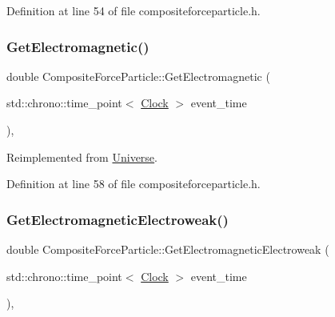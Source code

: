 Definition at line 54 of file compositeforceparticle.\+h.

\mbox{\label{class_composite_force_particle_a8ef336fed7e33d52a3baae4bd4dd32fd}} 
\subsubsection{\texorpdfstring{Get\+Electromagnetic()}{GetElectromagnetic()}}
{\footnotesize\ttfamily double Composite\+Force\+Particle\+::\+Get\+Electromagnetic (\begin{DoxyParamCaption}\item[{std\+::chrono\+::time\+\_\+point$<$ \mbox{\hyperlink{universe_8h_a0ef8d951d1ca5ab3cfaf7ab4c7a6fd80}{Clock}} $>$}]{event\+\_\+time }\end{DoxyParamCaption})\hspace{0.3cm}{\ttfamily [inline]}, {\ttfamily [virtual]}}



Reimplemented from \mbox{\hyperlink{class_universe_a63b850ef3f3394313353109d222bf5d1}{Universe}}.



Definition at line 58 of file compositeforceparticle.\+h.

\mbox{\label{class_composite_force_particle_ac26d7aab0daefcf13c68aba9e0f2ed53}} 
\subsubsection{\texorpdfstring{Get\+Electromagnetic\+Electroweak()}{GetElectromagneticElectroweak()}}
{\footnotesize\ttfamily double Composite\+Force\+Particle\+::\+Get\+Electromagnetic\+Electroweak (\begin{DoxyParamCaption}\item[{std\+::chrono\+::time\+\_\+point$<$ \mbox{\hyperlink{universe_8h_a0ef8d951d1ca5ab3cfaf7ab4c7a6fd80}{Clock}} $>$}]{event\+\_\+time }\end{DoxyParamCaption})\hspace{0.3cm}{\ttfamily [inline]}, {\ttfamily [virtual]}}



